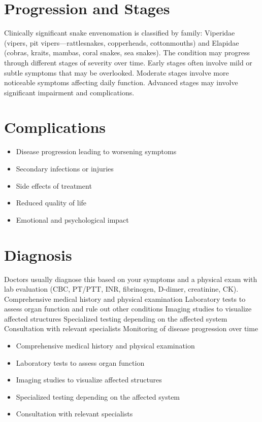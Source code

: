 \section{Progression and Stages}
Clinically significant snake envenomation is classified by family: Viperidae (vipers, pit vipers---rattlesnakes, copperheads, cottonmouths) and Elapidae (cobras, kraits, mambas, coral snakes, sea snakes). The condition may progress through different stages of severity over time. Early stages often involve mild or subtle symptoms that may be overlooked. Moderate stages involve more noticeable symptoms affecting daily function. Advanced stages may involve significant impairment and complications.
\section{Complications}
\begin{itemize}[noitemsep]
  \item Disease progression leading to worsening symptoms
  \item Secondary infections or injuries
  \item Side effects of treatment
  \item Reduced quality of life
  \item Emotional and psychological impact
\end{itemize}
\section{Diagnosis}
Doctors usually diagnose this based on your symptoms and a physical exam with lab evaluation (CBC, PT/PTT, INR, fibrinogen, D-dimer, creatinine, CK). Comprehensive medical history and physical examination Laboratory tests to assess organ function and rule out other conditions Imaging studies to visualize affected structures Specialized testing depending on the affected system Consultation with relevant specialists Monitoring of disease progression over time

\begin{itemize}[noitemsep]
  \item Comprehensive medical history and physical examination
  \item Laboratory tests to assess organ function
  \item Imaging studies to visualize affected structures
  \item Specialized testing depending on the affected system
  \item Consultation with relevant specialists
\end{itemize}
